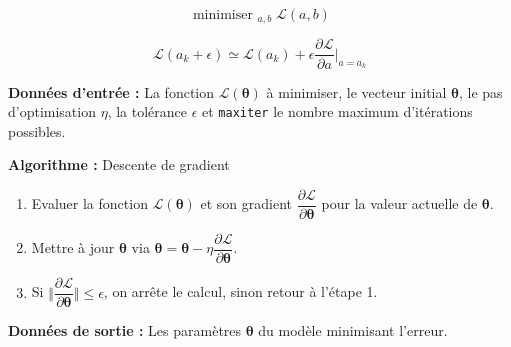 \documentclass[aspectratio=169]{beamer}
\DeclareMathOperator*{\minimize}{minimiser~}
\begin{document}
\begin{frame}
  \vfill
  \Large
  \[
  \minimize_{a, b} \mathcal{L}(a, b)
  \]
  \vfill
\end{frame}

\begin{frame}
  \vfill
  \begin{minipage}{.48\textwidth}
    \[
    \mathcal{L}(a_k + \epsilon) \simeq \mathcal{L}(a_k) + \epsilon \dfrac{\partial \mathcal{L}}{\partial a} \Big\vert_{a=a_k}
    \]
  \end{minipage}%
  \hfill
  \begin{minipage}{.48\textwidth}
    \centering
  \end{minipage}
  \vfill
\end{frame}


\begin{frame}
  \vfill
  \textbf{Données d'entrée :} La fonction $\mathcal{L}(\boldsymbol{\theta})$ à minimiser, le vecteur initial $\boldsymbol{\theta}$, le pas d'optimisation $\eta$, la tolérance $\epsilon$ et \texttt{maxiter} le nombre maximum d'itérations possibles.

  \bigskip

  \textbf{Algorithme :} Descente de gradient
  \begin{enumerate}
  \item Evaluer la fonction $\mathcal{L}(\boldsymbol{\theta})$ et son gradient $\dfrac{\partial \mathcal{L}}{\partial \boldsymbol{\theta}}$ pour la valeur actuelle de $\boldsymbol{\theta}$.

  \item Mettre à jour $\boldsymbol{\theta}$ via $\boldsymbol{\theta} = \boldsymbol{\theta} - \eta \dfrac{\partial \mathcal{L}}{\partial \boldsymbol{\theta}}$.

  \item Si $\Big\Vert \dfrac{\partial \mathcal{L}}{\partial \boldsymbol{\theta}} \Big\Vert \leq \epsilon$, on arrête le calcul, sinon retour à l'étape 1.
  \end{enumerate}

  \bigskip

  \textbf{Données de sortie :} Les paramètres $\boldsymbol{\theta}$ du modèle minimisant l'erreur.
  \vfill
\end{frame}
\end{document}
